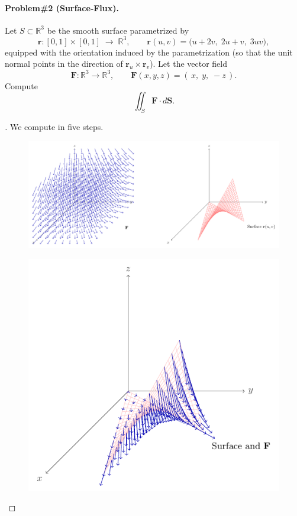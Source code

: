 \documentclass[11pt,openany]{article}
\begin{document}
\paragraph{{\color{magenta}Problem\;\#2} (Surface‐Flux).} 
Let \(S\subset\mathbb{R}^3\) be the smooth surface parametrized by  
\[
\mathbf r\colon [0,1]\times[0,1]\;\longrightarrow\;\mathbb{R}^3,
\qquad
\mathbf r(u,v)=\bigl(u+2v,\;2u+v,\;3uv\bigr),
\]  
equipped with the orientation induced by the parametrization (so that the unit normal points in the direction of \(\mathbf r_u\times\mathbf r_v\)).  Let the vector field   \[
\mathbf F\colon\mathbb{R}^3\to\mathbb{R}^3,
\qquad
\mathbf F(x,y,z)=(\,x,\;y,\;-z\,).
\]
Compute \[
\iint_{S}\mathbf F\cdot d\mathbf S.
\] 
\begin{proof}[\sol]
We compute in five steps.
\begin{figure}[h!]\centering
\includegraphics[width=\textwidth]{../riemann-tikz/problem2_1.pdf}
\end{figure}
\begin{figure}[h!]\centering
\includegraphics[width=\textwidth]{../riemann-tikz/problem2_2.pdf}
\end{figure}


\end{proof}
\end{document}
